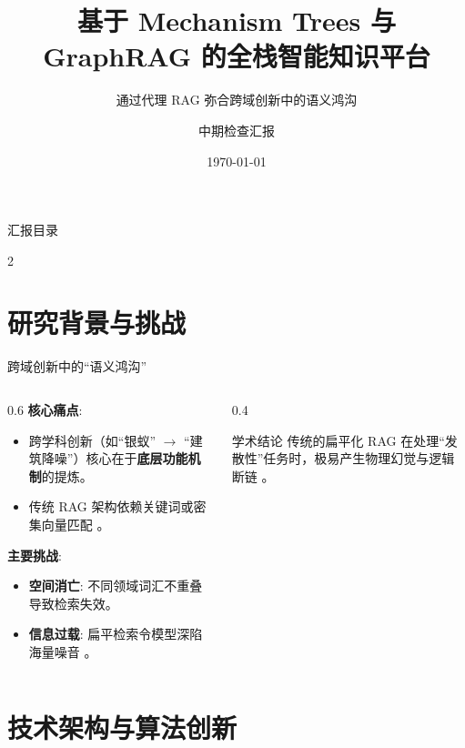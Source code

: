 \documentclass[aspectratio=169, 11pt]{ctexbeamer}
\title[全栈智能知识平台]{基于 Mechanism Trees 与 GraphRAG 的全栈智能知识平台}
\subtitle{通过代理 RAG 弥合跨域创新中的语义鸿沟}
\author{中期检查汇报}
\institute{C404 研发团队}
\date{\today}
\begin{document}
\begin{frame}
    \titlepage
\end{frame}

\begin{frame}{汇报目录}
    \begin{multicols}{2}
        \tableofcontents
    \end{multicols}
\end{frame}

\section{研究背景与挑战}

\begin{frame}{跨域创新中的“语义鸿沟”}
    \begin{columns}
        \begin{column}{0.6\textwidth}
            \textbf{核心痛点}:
            \begin{itemize}
                \item 跨学科创新（如“银蚁” $\rightarrow$ “建筑降噪”）核心在于\textbf{底层功能机制}的提炼。
                \item 传统 RAG 架构依赖关键词或密集向量匹配 \cite{microsoft2024graphrag}。
            \end{itemize}
            \vspace{0.3cm}
            \pause
            \textbf{主要挑战}:
            \begin{itemize}
                \item \textbf{空间消亡}: 不同领域词汇不重叠导致检索失效。
                \item \textbf{信息过载}: 扁平检索令模型深陷海量噪音 \cite{yang2025overload}。
            \end{itemize}
        \end{column}
        \begin{column}{0.4\textwidth}
            \begin{exampleblock}{学术结论}
                \small 传统的扁平化 RAG 在处理“发散性”任务时，极易产生物理幻觉与逻辑断链 \cite{han2025rag_vs_graphrag}。
            \end{exampleblock}
        \end{column}
    \end{columns}
\end{frame}

\section{技术架构与算法创新}
\end{document}
